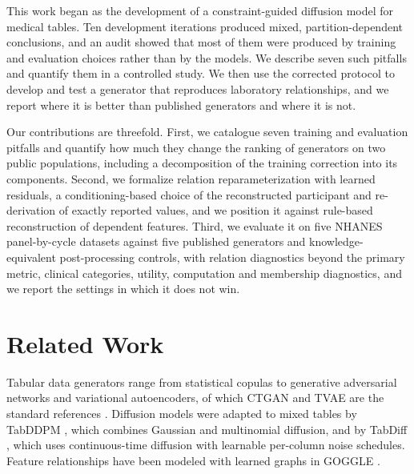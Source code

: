 \documentclass[conference]{IEEEtran}
\begin{document}
This work began as the development of a constraint-guided diffusion model for medical tables. Ten development iterations produced mixed, partition-dependent conclusions, and an audit showed that most of them were produced by training and evaluation choices rather than by the models. We describe seven such pitfalls and quantify them in a controlled study. We then use the corrected protocol to develop and test a generator that reproduces laboratory relationships, and we report where it is better than published generators and where it is not.

Our contributions are threefold. First, we catalogue seven training and evaluation pitfalls and quantify how much they change the ranking of generators on two public populations, including a decomposition of the training correction into its components. Second, we formalize relation reparameterization with learned residuals, a conditioning-based choice of the reconstructed participant and re-derivation of exactly reported values, and we position it against rule-based reconstruction of dependent features. Third, we evaluate it on five NHANES panel-by-cycle datasets against five published generators and knowledge-equivalent post-processing controls, with relation diagnostics beyond the primary metric, clinical categories, utility, computation and membership diagnostics, and we report the settings in which it does not win.

\section{Related Work}

Tabular data generators range from statistical copulas to generative adversarial networks and variational autoencoders, of which CTGAN and TVAE are the standard references \cite{xu2019ctgan}. Diffusion models \cite{ho2020ddpm,austin2021d3pm} were adapted to mixed tables by TabDDPM \cite{kotelnikov2023tabddpm}, which combines Gaussian and multinomial diffusion, and by TabDiff \cite{shi2025tabdiff}, which uses continuous-time diffusion with learnable per-column noise schedules. Feature relationships have been modeled with learned graphs in GOGGLE \cite{liu2023goggle}.
\end{document}
